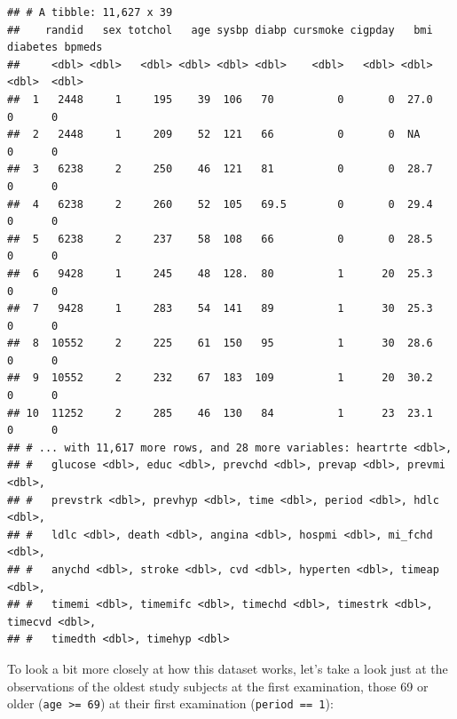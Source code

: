 \documentclass[
]{book}
\newenvironment{Shaded}{\begin{snugshade}}{\end{snugshade}}
\newcommand{\DecValTok}[1]{\textcolor[rgb]{0.00,0.00,0.81}{#1}}
\newcommand{\KeywordTok}[1]{\textcolor[rgb]{0.13,0.29,0.53}{\textbf{#1}}}
\newcommand{\NormalTok}[1]{#1}
\newcommand{\OperatorTok}[1]{\textcolor[rgb]{0.81,0.36,0.00}{\textbf{#1}}}
\newcommand{\StringTok}[1]{\textcolor[rgb]{0.31,0.60,0.02}{#1}}
\begin{document}
\begin{verbatim}
## # A tibble: 11,627 x 39
##    randid   sex totchol   age sysbp diabp cursmoke cigpday   bmi diabetes bpmeds
##     <dbl> <dbl>   <dbl> <dbl> <dbl> <dbl>    <dbl>   <dbl> <dbl>    <dbl>  <dbl>
##  1   2448     1     195    39  106   70          0       0  27.0        0      0
##  2   2448     1     209    52  121   66          0       0  NA          0      0
##  3   6238     2     250    46  121   81          0       0  28.7        0      0
##  4   6238     2     260    52  105   69.5        0       0  29.4        0      0
##  5   6238     2     237    58  108   66          0       0  28.5        0      0
##  6   9428     1     245    48  128.  80          1      20  25.3        0      0
##  7   9428     1     283    54  141   89          1      30  25.3        0      0
##  8  10552     2     225    61  150   95          1      30  28.6        0      0
##  9  10552     2     232    67  183  109          1      20  30.2        0      0
## 10  11252     2     285    46  130   84          1      23  23.1        0      0
## # ... with 11,617 more rows, and 28 more variables: heartrte <dbl>,
## #   glucose <dbl>, educ <dbl>, prevchd <dbl>, prevap <dbl>, prevmi <dbl>,
## #   prevstrk <dbl>, prevhyp <dbl>, time <dbl>, period <dbl>, hdlc <dbl>,
## #   ldlc <dbl>, death <dbl>, angina <dbl>, hospmi <dbl>, mi_fchd <dbl>,
## #   anychd <dbl>, stroke <dbl>, cvd <dbl>, hyperten <dbl>, timeap <dbl>,
## #   timemi <dbl>, timemifc <dbl>, timechd <dbl>, timestrk <dbl>, timecvd <dbl>,
## #   timedth <dbl>, timehyp <dbl>
\end{verbatim}

To look a bit more closely at how this dataset works, let's take a look just at the observations of the oldest study subjects at the first examination, those 69 or older (\texttt{age\ \textgreater{}=\ 69}) at their first examination (\texttt{period\ ==\ 1}):

\begin{Shaded}
\end{Shaded}
\end{document}
